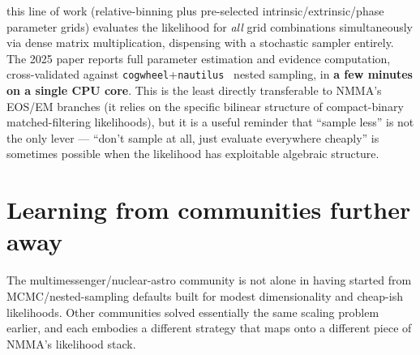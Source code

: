 \documentclass[11pt]{article}
\newcommand{\code}[1]{\texttt{#1}}
\begin{document}
\begin{itemize}[leftmargin=1.4em]
this line of work (relative-binning plus pre-selected intrinsic/extrinsic/phase parameter
grids) evaluates the likelihood for \emph{all} grid combinations simultaneously via dense
matrix multiplication, dispensing with a stochastic sampler entirely. The 2025 paper reports
full parameter estimation and evidence computation, cross-validated against
\code{cogwheel}+\code{nautilus}~\cite{Lange:2023ydq} nested sampling, in \textbf{a few
minutes on a single CPU core}. This is the least directly transferable to NMMA's EOS/EM
branches (it relies on the specific bilinear structure of compact-binary matched-filtering
likelihoods), but it is a useful reminder that ``sample less'' is not the only lever ---
``don't sample at all, just evaluate everywhere cheaply'' is sometimes possible when the
likelihood has exploitable algebraic structure.
\end{itemize}

\section{Learning from communities further away}
\label{sec:crosscult2}

The multimessenger/nuclear-astro community is not alone in having started from
MCMC/nested-sampling defaults built for modest dimensionality and cheap-ish likelihoods.
Other communities solved essentially the same scaling problem earlier, and each embodies a
different strategy that maps onto a different piece of NMMA's likelihood stack.
\end{document}
